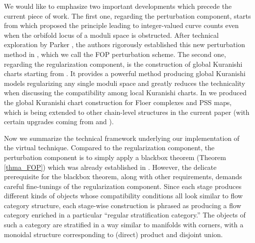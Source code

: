 \documentclass[reqno, 10pt]{amsart}
\numberwithin{equation}{section}
\numberwithin{equation}{section}
\theoremstyle{definition}
\theoremstyle{remark}
\begin{document}
We would like to emphasize two important developments which precede the current piece of work. The first one, regarding the perturbation component, starts from \cite{Fukaya_Ono_integer} which proposed the principle leading to integer-valued curve counts even when the orbifold locus of a moduli space is obstructed. After technical exploration by Parker \cite{BParker_integer}, the authors rigorously established this new perturbation method in \cite{Bai_Xu_2022}, which we call the FOP perturbation scheme. The second one, regarding the regularization component, is the construction of global Kuranishi charts starting from \cite{AMS}. It provides a powerful method producing global Kuranishi models regularizing any single moduli space and greatly reduces the technicality when discussing the compatibility among local Kuranishi charts. In \cite{Bai_Xu_Arnold} we produced the global Kuranishi chart construction for Floer complexes and PSS maps, which is being extended to other chain-level structures in the current paper (with certain upgrades coming from \cite{AMS2} and \cite{Hirschi_Swaminathan}).

Now we summarize the technical framework underlying our implementation of the virtual technique. Compared to the regularization component, the perturbation component is to simply apply a blackbox theorem (Theorem \ref{thma_FOP}) which was already established in \cite{Bai_Xu_2022}. However, the delicate prerequisite for the blackbox theorem, along with other requirements, demands careful fine-tunings of the regularization component. Since each stage produces different kinds of objects whose compatibility conditions all look similar to flow category structure, each stage-wise construction is phrased as producing a flow category enriched in a particular ``regular stratification category.'' The objects of such a category are stratified in a way similar to manifolds with corners, with a monoidal structure corresponding to (direct) product and disjoint union. 
\end{document}
